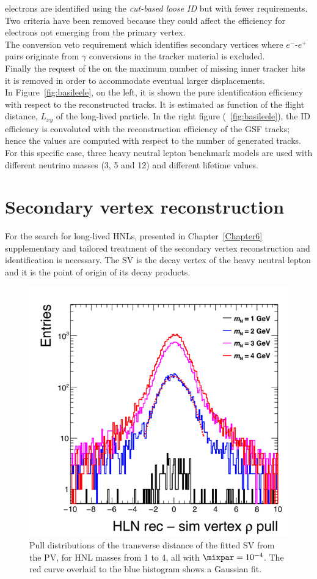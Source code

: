 \Displ electrons are identified using the \emph{cut-based loose ID}
but with fewer requirements. Two criteria have been removed because
they could affect the efficiency for electrons
not emerging from the primary vertex. \\
The conversion veto requirement which identifies
secondary vertices where $e^{-}$-$e^{+}$ pairs 
originate from $\gamma$ conversions in the tracker material is excluded.\\
Finally the request of the on the maximum number of
missing inner tracker hits it is removed in order to accommodate 
eventual larger displacements. \\
In Figure~\ref{fig:basileele}, on the left, it is shown the pure
identification efficiency with respect to the
reconstructed tracks. It is estimated as function of the flight
distance, $L_{xy}$ of the long-lived particle. In the right figure
(~\ref{fig:basileele}), the ID efficiency is convoluted with the
reconstruction efficiency of the GSF tracks; hence the values are
computed with respect to the number of
generated tracks. For this specific case, three heavy neutral lepton
benchmark models are used with different neutrino masses (3, 5 and
12\GeV) and different lifetime values.

\clearpage
\section{Secondary vertex reconstruction} \label{sec:c2sv}

For the search for long-lived HNLs, presented in
Chapter~\ref{Chapter6} supplementary and
tailored treatment of the secondary vertex reconstruction and
identification is necessary. The SV is the decay vertex of the heavy
neutral lepton and it is the point of origin of its decay products.
\begin{figure}
\centering
  \includegraphics[clip,trim=1.cm 0cm .5cm 1.3cm, width=.38\textwidth]{Figures/c2/leptons_fromN_fromNW_vtx_rho_pull.png}
  \caption{Pull distributions of the
    transverse distance of the fitted SV from
    the PV, for HNL masses from 1 to 4\GeV,
    all with $\mixpar=10^{-4}$. The red curve overlaid to the blue
    histogram shows a Gaussian fit. \dani}
  \label{fig:svPulls}
\end{figure} 

